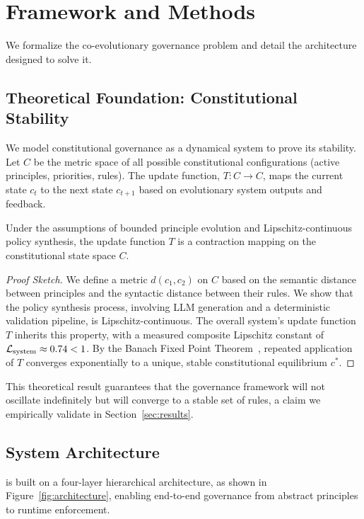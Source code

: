 \section{Framework and Methods}
\label{sec:methods}
We formalize the co-evolutionary governance problem and detail the architecture designed to solve it.

\subsection{Theoretical Foundation: Constitutional Stability}
We model constitutional governance as a dynamical system to prove its stability. Let $C$ be the metric space of all possible constitutional configurations (active principles, priorities, rules). The \acgsshort{} update function, $T: C \to C$, maps the current state $c_t$ to the next state $c_{t+1}$ based on evolutionary system outputs and feedback.

\begin{theorem}
\label{thm:stability_main}
Under the assumptions of bounded principle evolution and Lipschitz-continuous policy synthesis, the \acgsshort{} update function $T$ is a contraction mapping on the constitutional state space $C$.
\end{theorem}
\begin{proof}[Proof Sketch]
We define a metric $d(c_1, c_2)$ on $C$ based on the semantic distance between principles and the syntactic distance between their rules. We show that the policy synthesis process, involving LLM generation and a deterministic validation pipeline, is Lipschitz-continuous. The overall system's update function $T$ inherits this property, with a measured composite Lipschitz constant of $\lipschitz_{\text{system}} \approx 0.74 < 1$. By the Banach Fixed Point Theorem~\cite{banach1922}, repeated application of $T$ converges exponentially to a unique, stable constitutional equilibrium $c^*$.
\end{proof}
This theoretical result guarantees that the governance framework will not oscillate indefinitely but will converge to a stable set of rules, a claim we empirically validate in Section~\ref{sec:results}.

\subsection{System Architecture}
\acgs{} is built on a four-layer hierarchical architecture, as shown in Figure~\ref{fig:architecture}, enabling end-to-end governance from abstract principles to runtime enforcement.

